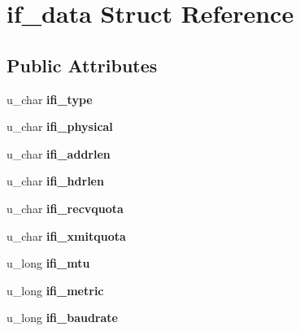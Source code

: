 \hypertarget{structif__data}{
\section{if\_\-data Struct Reference}
\label{structif__data}
}
\subsection*{Public Attributes}
\begin{DoxyCompactItemize}
\item 
\hypertarget{structif__data_ae8ca9cf602f25ebf4149d618712856d5}{
u\_\-char {\bfseries ifi\_\-type}}
\label{structif__data_ae8ca9cf602f25ebf4149d618712856d5}

\item 
\hypertarget{structif__data_a0c379d9c28c8859fe12638956bbd7a49}{
u\_\-char {\bfseries ifi\_\-physical}}
\label{structif__data_a0c379d9c28c8859fe12638956bbd7a49}

\item 
\hypertarget{structif__data_a5ec2282389f5c46221aa455216ceb1b4}{
u\_\-char {\bfseries ifi\_\-addrlen}}
\label{structif__data_a5ec2282389f5c46221aa455216ceb1b4}

\item 
\hypertarget{structif__data_a2d1c6511ed9ac257d006ba5f6880ca96}{
u\_\-char {\bfseries ifi\_\-hdrlen}}
\label{structif__data_a2d1c6511ed9ac257d006ba5f6880ca96}

\item 
\hypertarget{structif__data_a7d8171fc834fa301b0eb890adc14c2d2}{
u\_\-char {\bfseries ifi\_\-recvquota}}
\label{structif__data_a7d8171fc834fa301b0eb890adc14c2d2}

\item 
\hypertarget{structif__data_ad1d7416f6529d240538569d81ed7df61}{
u\_\-char {\bfseries ifi\_\-xmitquota}}
\label{structif__data_ad1d7416f6529d240538569d81ed7df61}

\item 
\hypertarget{structif__data_a1d5824d2aef792df07d9fbc3187e7826}{
u\_\-long {\bfseries ifi\_\-mtu}}
\label{structif__data_a1d5824d2aef792df07d9fbc3187e7826}

\item 
\hypertarget{structif__data_a35c5a8240cd70c5a40c342bdb1e9a88b}{
u\_\-long {\bfseries ifi\_\-metric}}
\label{structif__data_a35c5a8240cd70c5a40c342bdb1e9a88b}

\item 
\hypertarget{structif__data_a7a6facf4397af67ccff77aae60cbe275}{
u\_\-long {\bfseries ifi\_\-baudrate}}
\label{structif__data_a7a6facf4397af67ccff77aae60cbe275}


\end{DoxyCompactItemize}
